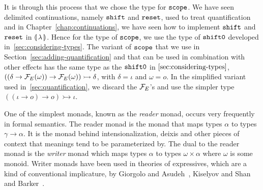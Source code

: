It is through this process that we chose the type for $\mathtt{scope}$. We have
seen delimited continuations, namely $\mathtt{shift}$ and $\mathtt{reset}$, used to treat
quantification~\cite{shan2004delimited,shan2005linguistic} and in
Chapter~\ref{chap:continuations}, we have seen how to implement $\mathtt{shift}$
and $\mathtt{reset}$ in $\llparenthesis \, \lambda \, \rrparenthesis$. Hence for the type of $\mathtt{scope}$, we
use the type of $\mathtt{shift0}$ developed in~\ref{sec:considering-types}. The
variant of $\mathtt{scope}$ that we use in
Section~\ref{sec:adding-quantification} and that can be used in combination
with other effects has the same type as the $\mathtt{shift0}$ in
$\ref{sec:considering-types}$,
$((\delta \to \mathcal{F}_E(\omega)) \to \mathcal{F}_E(\omega)) \rightarrowtail \delta$,
with $\delta = \iota$ and $\omega = o$. In the simplified variant used
in~\ref{sec:quantification}, we discard the $\mathcal{F}_E$'s and use the simpler
type $((\iota \to o) \to o) \rightarrowtail \iota$.

One of the simplest monads, known as the \emph{reader} monad, occurs very
frequently in formal semantics. The reader monad is the monad that maps
types $\alpha$ to types $\gamma \to \alpha$. It is the monad behind
intensionalization, deixis and other pieces of context that meanings tend
to be parameterized by. The dual to the reader monad is the \emph{writer}
monad which maps types $\alpha$ to types $\omega \times \alpha$ where
$\omega$ is some monoid. Writer monads have been used in theories of
expressives, which are a kind of conventional implicature, by Giorgolo and
Asudeh~\cite{giorgolo2011multidimensional,giorgolo2012monads}, Kiselyov and
Shan~\cite{kiselyov2010lambda} and Barker~\cite{barker2015monads}.

